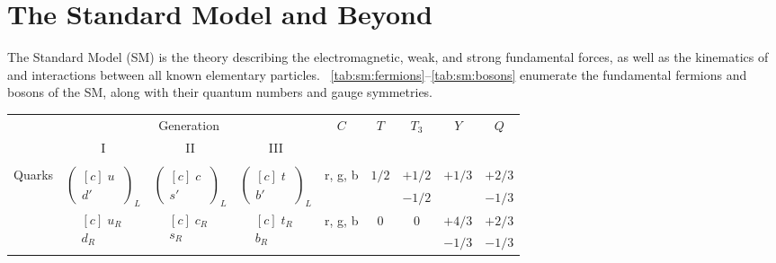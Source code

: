\newcommand{\mtworow}[1]{\multirow{2}{*}{#1}}

\chapter{The Standard Model and Beyond}
The Standard Model (SM) is the theory describing the electromagnetic, weak, and strong fundamental forces, as well as the kinematics of and interactions between all known elementary particles.
\Tabs~\ref{tab:sm:fermions}--\ref{tab:sm:bosons} enumerate the fundamental fermions and bosons of the SM, along with their quantum numbers and gauge symmetries.

\begin{table}
  \centering
  \begin{tabular}{cccc|ccccc}
    \hline 
    & \multicolumn{3}{c|}{Generation} & \mtworow{$C$} & \mtworow{$T$} & \mtworow{$T_3$} & \mtworow{$Y$} & \mtworow{$Q$}\\
    & I & II & III & & & & &\\
    \hline
    & & & & & & & &\\
    \multirow{4}{*}{Quarks} &
    \mtworow{$\begin{pmatrix*}[c]\;u\;\\d'\end{pmatrix*}_L$} &
    \mtworow{$\begin{pmatrix*}[c]\;c\;\\s'\end{pmatrix*}_L$} &
    \mtworow{$\begin{pmatrix*}[c]\;t\;\\b'\end{pmatrix*}_L$} &
            \mtworow{r, g, b} & \mtworow{$1/2$} & $+1/2$      & \mtworow{$+1/3$} & $+2/3$\\
    & & & &                   &                 & $-1/2$      &                  & $-1/3$\\

                     &
    \mtworow{$\begin{matrix*}[c]\;u_R\;\\d_R\end{matrix*}$} &
    \mtworow{$\begin{matrix*}[c]\;c_R\;\\s_R\end{matrix*}$} &
    \mtworow{$\begin{matrix*}[c]\;t_R\;\\b_R\end{matrix*}$} &
            \mtworow{r, g, b} & \mtworow{0}     & \mtworow{0} &          $+4/3$  & $+2/3$\\
    & & & &                   &                 &             &          $-1/3$  & $-1/3$\\


\end{tabular}
\end{table}
